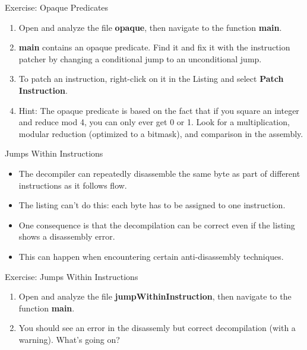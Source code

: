 \documentclass{beamer}
\begin{document}
\begin{frame}
\begin{block}{Exercise: Opaque Predicates}
\begin{enumerate}
\item Open and analyze the file \textbf{opaque}, then navigate to the function \textbf{main}.
\item \textbf{main} contains an opaque predicate.  Find it and fix it with the instruction patcher by changing a conditional jump to an unconditional jump.
\item To patch an instruction, right-click on it in the Listing and select \textbf{Patch Instruction}.
\item Hint: The opaque predicate is based on the fact that if you square an integer and reduce mod 4, you can only ever get 0 or 1.  Look for a multiplication, modular reduction (optimized to a bitmask), and comparison in the assembly.
\end{enumerate}
\end{block}
\end{frame}

\begin{frame}
\begin{block}{Jumps Within Instructions}
\begin{itemize}
\item The decompiler can repeatedly disassemble the same byte as part of different instructions as it follows flow.
\item The listing can't do this: each byte has to be assigned to one instruction.
\item One consequence is that the decompilation can be correct even if the listing shows a disassembly error.
\item This can happen when encountering certain anti-disassembly techniques.
\end{itemize}
\end{block}
\end{frame}

\begin{frame}
\begin{block}{Exercise: Jumps Within Instructions}
\begin{enumerate}
\item Open and analyze the file \textbf{jumpWithinInstruction}, then navigate to the function \textbf{main}.
\item You should see an error in the disassemly but correct decompilation (with a warning).  What's going on?
\end{enumerate}
\end{block}
\end{frame}
\end{document}
